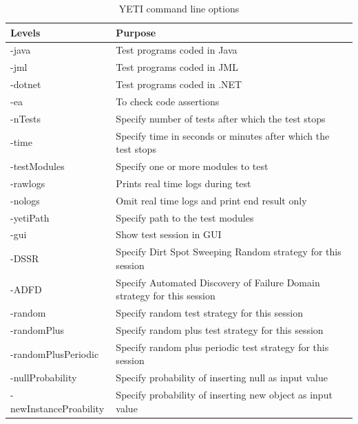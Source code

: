 \begin{table}[h]
\caption{YETI command line options} %
\smallskip
\centering %
\begin{tabular}{ll } %
\hline

Levels 					&Purpose 			\\
\hline
-java						&Test programs coded in Java	 	\\
-jml						&Test programs coded in JML			\\
-dotnet					&Test programs coded in .NET		\\
-ea						&To check code assertions \\
-nTests					&Specify number of tests after which the test stops	\\
-time						&Specify time in seconds or minutes after which the test stops\\
-testModules				&Specify one or more modules to test 	\\
-rawlogs					&Prints real time logs during test \\
-nologs					&Omit real time logs and print end result only\\
-yetiPath					&Specify path to the test modules\\ 
-gui						&Show test session in GUI\\
-DSSR					&Specify Dirt Spot Sweeping Random strategy for this session\\
-ADFD					&Specify Automated Discovery of Failure Domain strategy for this session\\
-random					&Specify random test strategy for this session\\
-randomPlus				&Specify random plus test strategy for this session\\
-randomPlusPeriodic		&Specify random plus periodic test strategy for this session\\
-nullProbability				&Specify probability of inserting null as input value\\
-newInstanceProability		&Specify probability of inserting new object as input value\\

\hline %
\end{tabular}
\bigskip
\label{table:cliOptions} %
\end{table}


